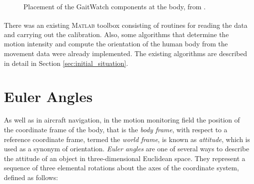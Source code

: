 \begin{figure}
\centering
{}
\caption{Placement of the GaitWatch components at the body, from \cite{olivares_vicente_gaitwatch_2013}.}
	\label{fig:GaitWatch_placement}
\end{figure}

There was an existing \textsc{Matlab}\textsuperscript{\textregistered} toolbox consisting of routines for reading the data and carrying out the calibration. Also, some algorithms that determine the motion intensity and compute the orientation of the human body from the movement data were already implemented. The existing algorithms are described in detail in Section \ref{sec:initial_situation}.

\section{Euler Angles}

As well as in aircraft navigation, in the motion monitoring field the position of the coordinate frame of the body, that is the \emph{body frame}, with respect to a reference coordinate frame, termed the \emph{world frame}, is known as \emph{attitude}, which is used as a synonym of orientation. \emph{Euler angles} are one of several ways to describe the attitude of an object in three-dimensional Euclidean space. They represent a sequence of three elemental rotations about the axes of the coordinate system, defined as follows:

